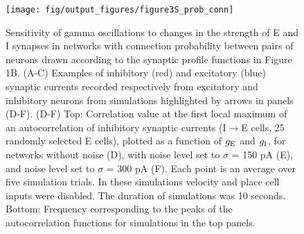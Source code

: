 \documentclass[a4paper,12pt]{article}
\newcommand{\ssc}[3]{\ensuremath{#1_{\text{#2}_{\text{#3}}}}}
\newcommand{\gE      }{\ssc{g}      {\scriptsize{E}}{}}
\newcommand{\gI      }{\ssc{g}      {\scriptsize{I}}{}}
\begin{document}
\setcounter{figure}{0}
\renewcommand{\figurename}{Figure 3 - figure supplement}

\begin{figure}[p]
    \internallinenumbers
    \centering
        \texttt{[image: fig/output\_figures/figure3S\_prob\_conn]}
\end{figure}

\clearpage

\begin{figure}[H]
    \internallinenumbers
    \caption{Sensitivity of gamma oscillations to changes in the strength of E
    and I synapses in networks with connection probability between pairs of
    neurons drawn according to the synaptic profile functions in Figure 1B.
    (A-C) Examples of inhibitory (red) and excitatory (blue) synaptic currents
    recorded respectively from excitatory and inhibitory neurons from
    simulations highlighted by arrows in panels (D-F).  (D-F) Top: Correlation
    value at the first local maximum of an autocorrelation of inhibitory
    synaptic currents (I$\rightarrow$E cells, 25 randomly selected E cells),
    plotted as a function of $\gE$ and $\gI$, for networks without noise (D), with
    noise level set to $\sigma$ = 150 pA (E), and noise level set to $\sigma$ =
    300 pA (F). Each point is an average over five simulation trials. In these
    simulations velocity and place cell inputs were disabled.  The duration of
    simulations was 10 seconds.  Bottom: Frequency corresponding to the peaks
    of the autocorrelation functions for simulations in the top panels.}
\end{figure}

\clearpage

%
%
%
\end{document}
